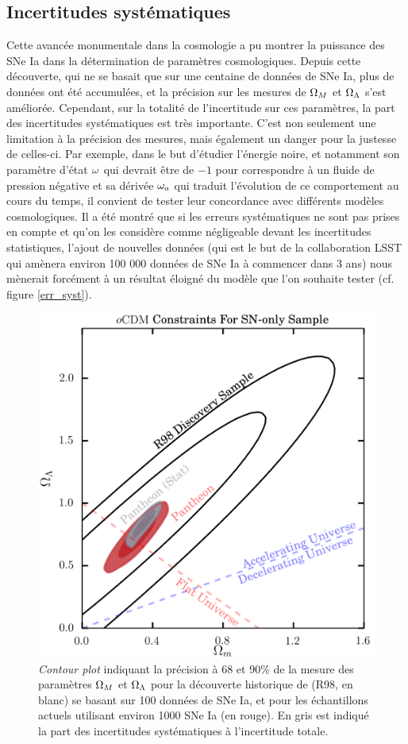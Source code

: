 \documentclass[a4paper, 12pt, svgnames]{article}
\begin{document}
\subsection{Incertitudes systématiques}\label{ssec:syst}
Cette avancée monumentale dans la cosmologie a pu montrer la puissance des SNe
Ia dans la détermination de paramètres cosmologiques. Depuis cette découverte,
qui ne se basait que sur une centaine de données de SNe Ia, plus de données ont
été accumulées, et la précision sur les mesures de $\Omega_M$ et $\Omega_\Lambda$ s'est
améliorée. Cependant, sur la totalité de l'incertitude sur ces paramètres, la
part des incertitudes systématiques est très importante. C'est non seulement une
limitation à la précision des mesures, mais également un danger pour la justesse
de celles-ci. Par exemple, dans le but d’étudier l’énergie noire, et notamment
son paramètre d’état $\omega$ qui devrait être de $-1$ pour correspondre à un fluide
de pression négative et sa dérivée $\omega_a$ qui traduit l’évolution de ce
comportement au cours du temps, il convient de tester leur concordance avec
différents modèles cosmologiques. Il a été montré que si les erreurs
systématiques ne sont pas prises en compte et qu'on les considère comme
négligeable devant les incertitudes statistiques, l'ajout de nouvelles données
(qui est le but de la collaboration LSST qui amènera environ 100 000 données de
SNe Ia à commencer dans 3 ans) nous mènerait forcément à un résultat éloigné du
modèle que l'on souhaite tester (cf. figure \ref{err_syst}).

\begin{figure}[htbp!]
    \centering
    \includegraphics[width=.5\linewidth]{Rapport_figures/scolnic_syst.png}
    \captionsetup{justification=centering}
    \caption{\textit{Contour plot} indiquant la précision à 68 et 90\% de la
    mesure des paramètres $\Omega_M$ et $\Omega_\Lambda$ pour la découverte historique de
     (R98, en blanc) se basant sur 100 données de SNe Ia, et
    pour les échantillons actuels utilisant environ 1000 SNe Ia (en rouge). En
    gris est indiqué la part des incertitudes systématiques à l'incertitude
    totale. \cite{scolnic_complete_2018}}
    \label{scolnic_syst}
\end{figure}
\end{document}
